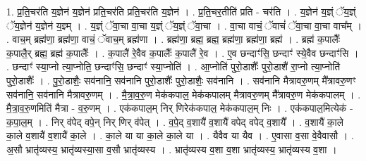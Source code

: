 \documentclass[17pt]{extarticle}
\begin{document}
1. प्र॒ति॒चर॑ति य॒ज्ञेन॑ य॒ज्ञेन॑ प्रति॒चर॑ति प्रति॒चर॑ति य॒ज्ञेन॑ । . प्र॒ति॒चर॒तीति॑ प्रति - चर॑ति । . य॒ज्ञेन॑ य॒ज्ञ्ं ॅय॒ज्ञ्ं ॅय॒ज्ञेन॑ य॒ज्ञेन॑ य॒ज्ञ्म् । . य॒ज्ञ्ं ॅवा॒चा वा॒चा य॒ज्ञ्ं ॅय॒ज्ञ्ं ॅवा॒चा । . वा॒चा वाचं॒ ॅवाचं॑ ॅवा॒चा वा॒चा वाच᳚म् । . वाच॒म् ब्रह्म॑णा॒ ब्रह्म॑णा॒ वाचं॒ ॅवाच॒म् ब्रह्म॑णा । . ब्रह्म॑णा॒ ब्रह्म॒ ब्रह्म॒ ब्रह्म॑णा॒ ब्रह्म॑णा॒ ब्रह्म॑ । . ब्रह्म॑ क॒पालैः᳚ क॒पालै॒र् ब्रह्म॒ ब्रह्म॑ क॒पालैः᳚ । . क॒पालै॑ रे॒वैव क॒पालैः᳚ क॒पालै॑ रे॒व । . ए॒व छन्दाꣳ॑सि॒ छन्दाꣳ॑ स्ये॒वैव छन्दाꣳ॑सि । . छन्दाꣳ॑ स्या॒प्नो त्या॒प्नोति॒ छन्दाꣳ॑सि॒ छन्दाꣳ॑ स्या॒प्नोति॑ । . आ॒प्नोति॑ पुरो॒डाशैः᳚ पुरो॒डाशै॑ रा॒प्नो त्या॒प्नोति॑ पुरो॒डाशैः᳚ । . पु॒रो॒डाशैः॒ सव॑नानि॒ सव॑नानि पुरो॒डाशैः᳚ पुरो॒डाशैः॒ सव॑नानि । . सव॑नानि मैत्रावरु॒णम् मै᳚त्रावरु॒णꣳ सव॑नानि॒ सव॑नानि मैत्रावरु॒णम् । . मै॒त्रा॒व॒रु॒ण मेक॑कपाल॒ मेक॑कपालम् मैत्रावरु॒णम् मै᳚त्रावरु॒ण मेक॑कपालम् । . मै॒त्रा॒व॒रु॒णमिति॑ मैत्रा - व॒रु॒णम् । . एक॑कपाल॒म् निर् णिरेक॑कपाल॒ मेक॑कपाल॒म् निः । . एक॑कपाल॒मित्येक॑ - क॒पा॒ल॒म् । . निर् व॑पेद् वपे॒न् निर् णिर् व॑पेत् । . व॒पे॒द् व॒शायै॑ व॒शायै॑ वपेद् वपेद् व॒शायै᳚ । . व॒शायै॑ का॒ले का॒ले व॒शायै॑ व॒शायै॑ का॒ले । . का॒ले या या का॒ले का॒ले या । . यैवैव या यैव । . ए॒वासा व॒सा वे॒वैवासौ । . अ॒सौ भ्रातृ॑व्यस्य॒ भ्रातृ॑व्यस्या॒सा व॒सौ भ्रातृ॑व्यस्य । . भ्रातृ॑व्यस्य व॒शा व॒शा भ्रातृ॑व्यस्य॒ भ्रातृ॑व्यस्य व॒शा । \newline
\end{document}

